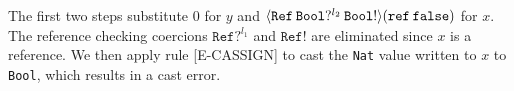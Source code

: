 The first two steps substitute 0 for $y$ and 
$\langle \texttt{Ref} \hspace{0.2em} \texttt{Bool}? ^{l_2} \hspace{0.2em} \texttt{Bool}! \rangle 
(\texttt{ref} \hspace{0.2em} \texttt{false})$ 
for $x$. The reference checking coercions $\texttt{Ref}? ^{l_1}$ and $\texttt{Ref}!$ are eliminated 
since $x$ is a reference. We then apply rule {\scriptsize{[E-CASSIGN]}} 
to cast the \texttt{Nat} value written to $x$ to \texttt{Bool}, which results in a cast error.
